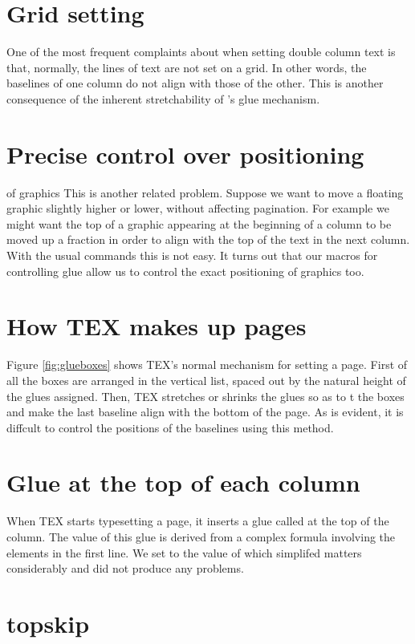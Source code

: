 {\section{Grid setting}

One of the most frequent complaints about \tex
when setting double column text is that, normally,
the lines of text are not set on a grid. In other words,
the baselines of one column do not align with those
of the other. This is another consequence of the
inherent stretchability of \tex's glue mechanism.

\section{Precise control over positioning}
of graphics
This is another related problem. Suppose we want
to move a 
floating graphic slightly higher or lower,
without affecting pagination. For example we might
want the top of a graphic appearing at the beginning
of a column to be moved up a fraction in order to
align with the top of the text in the next column.
With the usual \latex commands this is not easy. It
turns out that our macros for controlling glue allow
us to control the exact positioning of graphics too.

\section{How TEX makes up pages}

Figure \ref{fig:glueboxes} shows TEX's normal mechanism for setting
a page. First of all the boxes are arranged in the
vertical list, spaced out by the natural height of the
glues assigned. Then, TEX stretches or shrinks the
glues so as to t the boxes and make the last baseline
align with the bottom of the page. As is evident, it
is diffcult to control the positions of the baselines
using this method.


\section{Glue at the top of each column}

When TEX starts typesetting a page, it inserts a glue
called  at the top of the column. The value
of this glue is derived from a complex formula involving 
the elements in the first line. We set  to
the value of  which simplifed matters considerably and did not produce any problems.

\section{topskip}

}
